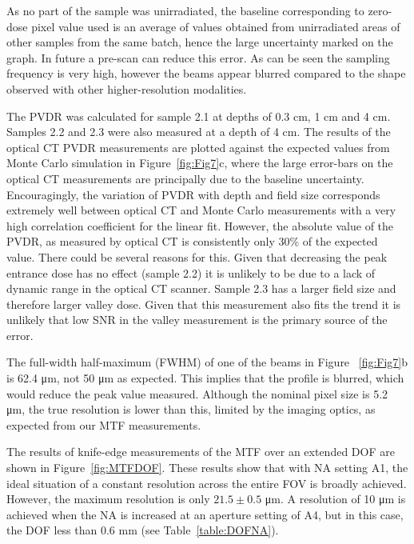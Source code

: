 	As no part of the sample was unirradiated, the baseline corresponding to zero-dose pixel value used is an average of values obtained from unirradiated areas of other samples from the same batch, hence the large uncertainty marked on the graph. In future a pre-scan can reduce this error. As can be seen the sampling frequency is very high, however the beams appear blurred compared to the shape observed with other higher-resolution modalities. 
	
	The PVDR was calculated for sample 2.1 at depths of 0.3 cm, 1 cm and 4 cm. Samples 2.2 and 2.3 were also measured at a depth of 4 cm. The results of the optical CT PVDR measurements are plotted against the expected values from Monte Carlo simulation \cite{martinez-roviradevelopment2012} in Figure~\ref{fig:Fig7}c, where the large error-bars on the optical CT measurements are principally due to the baseline uncertainty. Encouragingly, the variation of PVDR with depth and field size corresponds extremely well between optical CT and Monte Carlo measurements with a very high correlation coefficient for the linear fit. However, the absolute value of the PVDR, as measured by optical CT is consistently only 30\% of the expected value. There could be several reasons for this. Given that decreasing the peak entrance dose has no effect (sample 2.2) it is unlikely to be due to a lack of dynamic range in the optical CT scanner. Sample 2.3 has a larger field size and therefore larger valley dose. Given that this measurement also fits the trend it is unlikely that low SNR in the valley measurement is the primary source of the error. 
	
	The full-width half-maximum (FWHM) of one of the beams in Figure ~\ref{fig:Fig7}b is 62.4 \si{\um}, not 50 \si{\um} as expected. This implies that the profile is blurred, which would reduce the peak value measured. Although the nominal pixel size is 5.2 \si{\um}, the true resolution is lower than this, limited by the imaging optics, as expected from our MTF measurements. 
	
	The results of knife-edge measurements of the MTF over an extended DOF are shown in Figure~\ref{fig:MTFDOF}. These results show that with NA setting A1, the ideal situation of a constant resolution across the entire FOV is broadly achieved. However, the maximum resolution is only $21.5 \pm 0.5$ \si{\um}. A resolution of 10 \si{\um} is achieved when the NA is increased at an aperture setting of A4, but in this case, the DOF less than 0.6 mm (see Table~\ref{table:DOFNA}).
	

